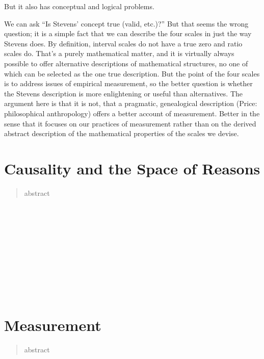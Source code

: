 \documentclass[11pt,twoside]{article}
\begin{document}
But it also has conceptual and logical problems.

We can ask ``Is Stevens' concept true (valid, etc.)?''  But that seems
the wrong question; it is a simple fact that we can describe the four
scales in just the way Stevens does.  By definition, interval scales
do not have a true zero and ratio scales do.  That's a purely
mathematical matter, and it is virtually always possible to offer
alternative descriptions of mathematical structures, no one of which
can be selected as the one true description.  But the point of the
four scales is to address issues of empirical measurement, so the
better question is whether the Stevens description is more
enlightening or useful than alternatives.  The argument here is that
it is not, that a pragmatic, genealogical description (Price:
philosophical anthropology) offers a better account of measurement.
Better in the sense that it focuses on our practices of measurement
rather than on the derived abstract description of the mathematical
properties of the scales we devise.

\section{Causality and the Space of Reasons}

\begin{abstract}
abstract
\end{abstract}

\noindent
\cite{abell_narrative_2004} \\
\cite{crane_mental_1995} \\
\cite{gross_pragmatist_2009} \\
\cite{jackson_mental_1996} \\
\cite{lowe_causal_1993} \\
\cite{lowe_non-cartesian_2006} \\
\cite{macdonald_mental_1986} \\
\cite{menzies_causation_1993} \\
\cite{morris_causes_1986} \\
\cite{williamson_broadness_1998}

\clearpage
\section{Measurement}

\begin{abstract}
abstract
\end{abstract}
\end{document}
